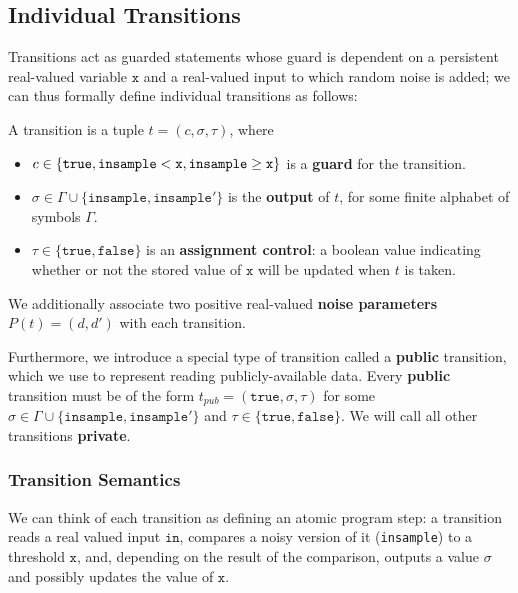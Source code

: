 
\subsection{Individual Transitions}

Transitions act as guarded statements whose guard is dependent on a persistent real-valued variable $\texttt{x}$ and a real-valued input to which random noise is added; we can thus formally define individual transitions as follows:

\begin{defn}[Transitions]\label{svTransDef}
    A transition is a tuple $t = (c, \sigma, \tau)$, where \begin{itemize}
        \item $c\in \{\texttt{true}, \lguard[\texttt{x}], \gguard[\texttt{x}]\}$ is a \textbf{guard} for the transition.
        \item $\sigma \in \Gamma\cup\{\texttt{insample}, \texttt{insample}'\}$ is the \textbf{output} of $t$, for some finite alphabet of symbols $\Gamma$.
        \item $\tau\in\{\texttt{true}, \texttt{false}\}$ is an \textbf{assignment control}: a boolean value indicating whether or not the stored value of $\texttt{x}$ will be updated when $t$ is taken.
    \end{itemize}
\end{defn}

We additionally associate two positive real-valued \textbf{noise parameters} $P(t) = (d, d')$ with each transition. 

Furthermore, we introduce a special type of transition called a \textbf{public} transition, which we use to represent reading publicly-available data. Every \textbf{public} transition must be of the form $t_{pub}= (\texttt{true}, \sigma, \tau)$ for some $\sigma \in \Gamma\cup\{\texttt{insample}, \texttt{insample}'\}$ and $\tau \in \{\texttt{true}, \texttt{false}\}$. We will call all other transitions \textbf{private}. 

\subsubsection{Transition Semantics}

We can think of each transition as defining an atomic program step: a transition reads a real valued input $\texttt{in}$, compares a noisy version of it (\texttt{insample}) to a threshold $\texttt{x}$, and, depending on the result of the comparison, outputs a value $\sigma$ and possibly updates the value of $\texttt{x}$.

